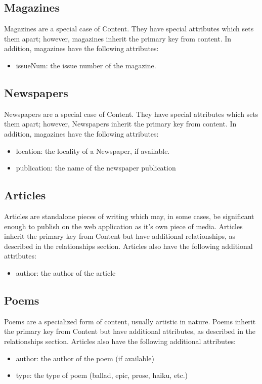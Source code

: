 \documentclass[letter, 12pt, titlepage]{article}
\begin{document}
			\subsection{Magazines}
				Magazines are a special case of Content. They have special attributes which sets them apart; however, magazines inherit the primary key from content. In addition, magazines have the following attributes:
			\begin{itemize}
				\item issueNum: the issue number of the magazine.
			\end{itemize}		
			\subsection{Newspapers} 
				Newspapers are a special case of Content. They have special attributes which sets them apart; however, Newspapers inherit the primary key from content. In addition, magazines have the following attributes:
			\begin{itemize}
				\item location: the locality of a Newspaper, if available.
				\item publication: the name of the newspaper publication
			\end{itemize}	
			\subsection{Articles}		
			Articles are standalone pieces of writing which may, in some cases, be significant enough to publish on the web application as it's own piece of media. Articles inherit the primary key from Content but have additional relationships, as described in the relationships section. Articles also have the following additional attributes:
			\begin{itemize}
				\item author: the author of the article
			\end{itemize}
		\subsection{Poems}		
			Poems are a specialized form of content, usually artistic in nature. Poems inherit the primary key from Content but have additional attributes, as described in the relationships section. Articles also have the following additional attributes:
			\begin{itemize}
				\item author: the author of the poem (if available)
				\item type: the type of poem (ballad, epic, prose, haiku, etc.)
			\end{itemize}
					
\end{document}
